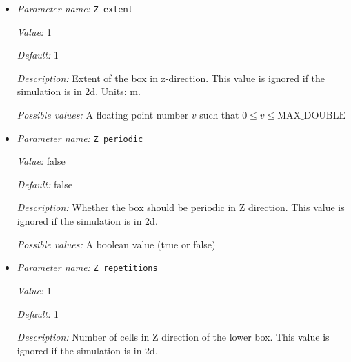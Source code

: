 \begin{itemize}
{\it Default:} 1


{\it Description:} Number of cells in Y direction in the lithosphere. This value is ignored if the simulation is in 3d.


{\it Possible values:} An integer $n$ such that $1\leq n \leq 2147483647$
\item {\it Parameter name:} {\tt Z extent}
\label{parameters:Geometry model/Box with lithosphere boundary indicators/Z extent}
\label{parameters:Geometry_20model/Box_20with_20lithosphere_20boundary_20indicators/Z_20extent}


{\it Value:} 1


{\it Default:} 1


{\it Description:} Extent of the box in z-direction. This value is ignored if the simulation is in 2d. Units: m.


{\it Possible values:} A floating point number $v$ such that $0 \leq v \leq \text{MAX\_DOUBLE}$
\item {\it Parameter name:} {\tt Z periodic}
\label{parameters:Geometry model/Box with lithosphere boundary indicators/Z periodic}
\label{parameters:Geometry_20model/Box_20with_20lithosphere_20boundary_20indicators/Z_20periodic}


{\it Value:} false


{\it Default:} false


{\it Description:} Whether the box should be periodic in Z direction. This value is ignored if the simulation is in 2d.


{\it Possible values:} A boolean value (true or false)
\item {\it Parameter name:} {\tt Z repetitions}
\label{parameters:Geometry model/Box with lithosphere boundary indicators/Z repetitions}
\label{parameters:Geometry_20model/Box_20with_20lithosphere_20boundary_20indicators/Z_20repetitions}


{\it Value:} 1


{\it Default:} 1


{\it Description:} Number of cells in Z direction of the lower box. This value is ignored if the simulation is in 2d.



\end{itemize}
